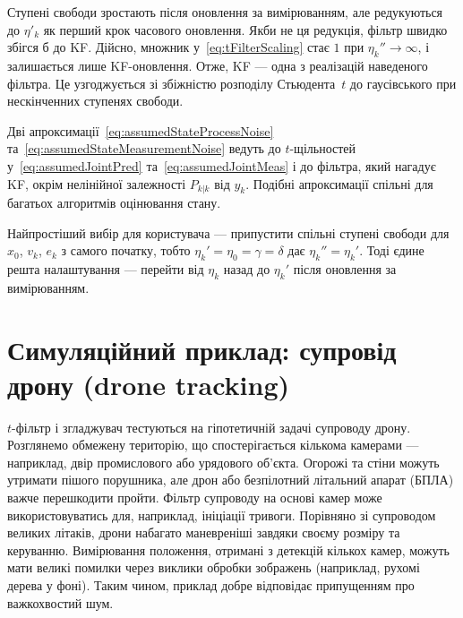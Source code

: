 \documentclass[]{article}
\renewcommand{\k}{_k}
\newcommand{\kk}{_{k|k}}
\begin{document}
Ступені свободи зростають після оновлення за вимірюванням, але редукуються до $\eta'\k$ як перший крок часового оновлення. Якби не ця редукція, фільтр швидко збігся б до KF. Дійсно, множник у~\eqref{eq:tFilterScaling} стає $1$ при $\eta\k''\to\infty$, і залишається лише KF-оновлення. Отже, KF — одна з реалізацій наведеного фільтра. Це узгоджується зі збіжністю розподілу Стьюдента~$t$ до гаусівського при нескінченних ступенях свободи.

Дві апроксимації~\eqref{eq:assumedStateProcessNoise} та~\eqref{eq:assumedStateMeasurementNoise} ведуть до $t$-щільностей у~\eqref{eq:assumedJointPred} та~\eqref{eq:assumedJointMeas} і до фільтра, який нагадує KF, окрім нелінійної залежності $P\kk$ від $y\k$. Подібні апроксимації спільні для багатьох алгоритмів оцінювання стану.

Найпростіший вибір для користувача — припустити спільні ступені свободи для $x_0$, $v\k$, $e\k$ з самого початку, тобто $\eta\k'=\eta_0=\gamma=\delta$ дає $\eta\k''=\eta\k'$. Тоді єдине решта налаштування — перейти від $\eta\k$ назад до $\eta\k'$ після оновлення за вимірюванням.

\section{Симуляційний приклад: супровід дрону (drone tracking)}\label{sec:examples}

$t$-фільтр і згладжувач тестуються на гіпотетичній задачі супроводу дрону. Розглянемо обмежену територію, що спостерігається кількома камерами — наприклад, двір промислового або урядового об'єкта. Огорожі та стіни можуть утримати пішого порушника, але дрон або безпілотний літальний апарат (БПЛА) важче перешкодити пройти. Фільтр супроводу на основі камер може використовуватись для, наприклад, ініціації тривоги.
Порівняно зі супроводом великих літаків, дрони набагато маневреніші завдяки своєму розміру та керуванню. Вимірювання положення, отримані з детекцій кількох камер, можуть мати великі помилки через виклики обробки зображень (наприклад, рухомі дерева у фоні). Таким чином, приклад добре відповідає припущенням про важкохвостий шум.
\end{document}
